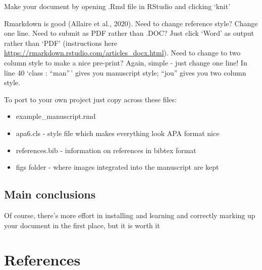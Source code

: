 \documentclass[
  english,
  ,jou,floatsintext]{apa6}
\providecommand{\tightlist}{%
  \setlength{\itemsep}{0pt}\setlength{\parskip}{0pt}}
\begin{document}
Make your document by opening .Rmd file in RStudio and clicking `knit'

Rmarkdown is good (Allaire et al., 2020). Need to change reference style? Change one line. Need to submit as PDF rather than .DOC? Just click `Word' as output rather than `PDF' (instructions here \url{https://rmarkdown.rstudio.com/articles_docx.html}). Need to change to two column style to make a nice pre-print? Again, simple - just change one line! In line 40 `class : ``man''\,' gives you manuscript style; ``jou'' gives you two column style.

To port to your own project just copy across these files:

\begin{itemize}
\tightlist
\item
  example\_manuscript.rmd
\item
  apa6.cls - style file which makes everything look APA format nice
\item
  references.bib - information on references in bibtex format
\item
  figs folder - where images integrated into the manuscript are kept
\end{itemize}

\hypertarget{main-conclusions}{%
\subsection{Main conclusions}\label{main-conclusions}}

Of course, there's more effort in installing and learning and correctly marking up your document in the first place, but it is worth it

\hypertarget{references}{%
\section*{References}\label{references}}
\end{document}
